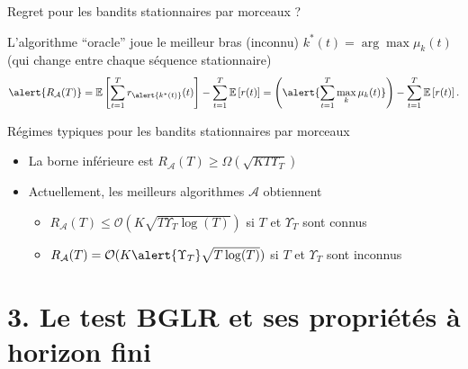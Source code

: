 \documentclass[11pt,french,ignorenonframetext,]{beamer}
\providecommand{\tightlist}{%
  \setlength{\itemsep}{0pt}\setlength{\parskip}{0pt}}
\begin{document}
\begin{frame}{Regret pour les bandits stationnaires par morceaux ?}

  L'algorithme ``oracle'' joue le meilleur bras (inconnu) $k^*(t) = \arg\max \mu_k(t)$
  (qui change entre chaque séquence stationnaire)
  \[ \alert{ R_{\mathcal{A}}(T) } = \mathbb{E}\left[ \sum\limits_{t=1}^T r_{\alert{k^*(t)}}(t) \right] - \sum\limits_{t=1}^T \mathbb{E}\left[ r(t) \right] = \left(\alert{\sum_{t=1}^T \max_k \mu_k(t)} \right) - \sum\limits_{t=1}^T \mathbb{E}\left[ r(t) \right]. \]

\pause
\vspace*{10pt}

\begin{exampleblock}{Régimes typiques pour les bandits stationnaires par morceaux}
  \begin{itemize}
  \item
  La borne inférieure est
  $R_{\mathcal{A}}(T) \geq \Omega(\sqrt{K T \Upsilon_T})$

  \item
  Actuellement, les meilleurs algorithmes $\mathcal{A}$  obtiennent
    \begin{itemize}\tightlist
      \item
      $R_{\mathcal{A}}(T) \leq \mathcal{O}(K \sqrt{T \Upsilon_T \log(T)})$
      si $T$ et $\Upsilon_T$ sont connus
      \item
      $R_{\mathcal{A}}(T) = \mathcal{O}(K \alert{\Upsilon_T} \sqrt{T \log(T)})$
      si $T$ et $\Upsilon_T$ sont inconnus
    \end{itemize}
  \end{itemize}
\end{exampleblock}

\end{frame}


\section{\hfill{}3. Le test BGLR et ses propriétés à horizon fini\hfill{}}
\end{document}
